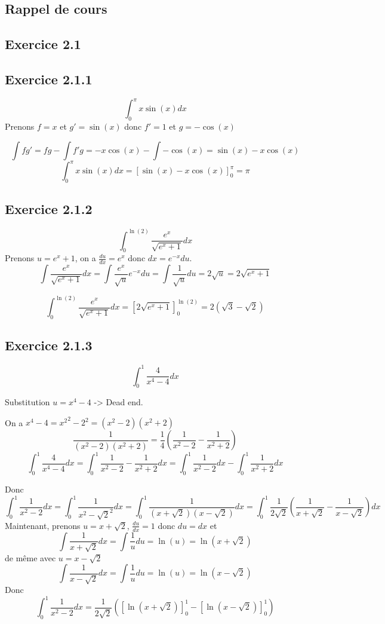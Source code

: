 \documentclass[]{book}
\theoremstyle{definition}
\begin{document}
\subsection*{Rappel de cours}

\newpage
\subsection*{Exercice 2.1}
\subsection*{Exercice 2.1.1}
$$\int_{0}^{\pi}{x\sin(x) dx}$$
Prenons $f = x$ et $g' = \sin(x)$ donc $f' = 1$ et $g = -\cos(x)$

$$\int{fg'} = fg - \int{f'g} = -x\cos(x) - \int{-\cos(x)} = \sin(x) - x\cos(x)$$
$$\int_{0}^{\pi}{x\sin(x) dx} = \left[ \sin(x) - x\cos(x) \right]_{0}^{\pi} = \pi$$

\subsection*{Exercice 2.1.2}
$$\int_{0}^{\ln(2)}{\frac{e^x}{\sqrt{e^x+1}}dx}$$
Prenons $u=e^x+1$, on a $\frac{du}{dx}=e^x$ donc $dx = e^{-x}du$.
$$\int{\frac{e^x}{\sqrt{e^x+1}}dx} = \int{\frac{e^x}{\sqrt{u}}e^{-x}du} = \int{\frac{1}{\sqrt{u}}du} = 2\sqrt{u} = 2\sqrt{e^x+1}$$

$$\int_{0}^{\ln(2)}{\frac{e^x}{\sqrt{e^x+1}}dx} = \left[ 2\sqrt{e^x+1} \right]_{0}^{\ln(2)} = 2(\sqrt{3} - \sqrt{2})$$


\subsection*{Exercice 2.1.3}
$$\int_{0}^{1}{\frac{4}{x^4-4}dx}$$

Substitution $u=x^4-4$ -> Dead end.

On a $x^4-4 = {x^2}^2 - 2^2 = (x^2-2)(x^2+2)$
$$\frac{1}{(x^2-2)(x^2+2)} = \frac{1}{4}(\frac{1}{x^2-2} - \frac{1}{x^2+2})$$
$$\int_{0}^{1}{\frac{4}{x^4-4}dx} = \int_{0}^{1}{\frac{1}{x^2-2} - \frac{1}{x^2+2}dx} = \int_{0}^{1}{\frac{1}{x^2-2}dx} - \int_{0}^{1}{\frac{1}{x^2+2}dx}$$

Donc
$$
\int_{0}^{1}{\frac{1}{x^2-2}dx} = \int_{0}^{1}{\frac{1}{x^2-\sqrt{2}^2}dx} = \int_{0}^{1}{\frac{1}{(x+\sqrt{2})(x-\sqrt{2})}dx} = \int_{0}^{1}{\frac{1}{2\sqrt{2}}\left(\frac{1}{x+\sqrt{2}} - \frac{1}{x-\sqrt{2}}\right)dx}
$$
Maintenant, prenons $u = x+\sqrt{2}$, $\frac{du}{dx} = 1$ donc $du=dx$ et 
$$
\int{\frac{1}{x+\sqrt{2}}dx} = \int{\frac{1}{u}du} =\ln(u) = \ln(x+\sqrt{2})
$$
de m\^eme avec $u = x-\sqrt{2}$
$$
\int{\frac{1}{x-\sqrt{2}}dx} = \int{\frac{1}{u}du} =\ln(u) = \ln(x-\sqrt{2})
$$
Donc
$$
\int_{0}^{1}{\frac{1}{x^2-2}dx} = \frac{1}{2\sqrt{2}}\left( \left[ \ln(x + \sqrt{2}) \right]_{0}^{1} - \left[ \ln(x - \sqrt{2} ) \right]_{0}^{1} \right)
$$
\end{document}
